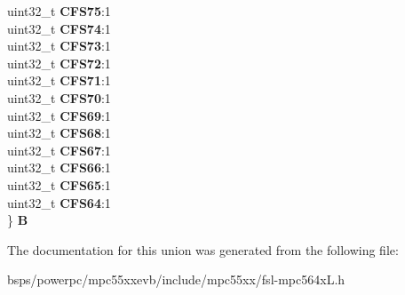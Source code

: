 \begin{DoxyCompactItemize}
\begin{tabbing}
\>uint32\_t {\bfseries CFS75}:1\\
\>uint32\_t {\bfseries CFS74}:1\\
\>uint32\_t {\bfseries CFS73}:1\\
\>uint32\_t {\bfseries CFS72}:1\\
\>uint32\_t {\bfseries CFS71}:1\\
\>uint32\_t {\bfseries CFS70}:1\\
\>uint32\_t {\bfseries CFS69}:1\\
\>uint32\_t {\bfseries CFS68}:1\\
\>uint32\_t {\bfseries CFS67}:1\\
\>uint32\_t {\bfseries CFS66}:1\\
\>uint32\_t {\bfseries CFS65}:1\\
\>uint32\_t {\bfseries CFS64}:1\\
\} {\bfseries B}\\

\end{tabbing}\end{DoxyCompactItemize}


The documentation for this union was generated from the following file\+:\begin{DoxyCompactItemize}
\item 
bsps/powerpc/mpc55xxevb/include/mpc55xx/fsl-\/mpc564x\+L.\+h\end{DoxyCompactItemize}
